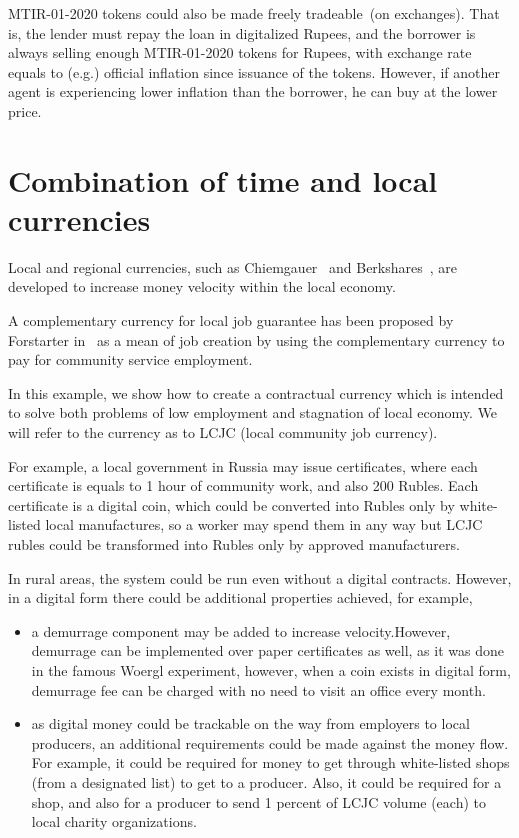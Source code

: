 \documentclass[]{llncs}   %
\begin{document}
 MTIR-01-2020 tokens could also be made freely tradeable~(on exchanges). That is, the lender must repay the loan in
 digitalized Rupees, and the borrower is always selling enough MTIR-01-2020 tokens for Rupees, with exchange rate equals
 to (e.g.) official inflation since issuance of the tokens. However, if another agent is experiencing lower inflation
 than the borrower, he can buy at the lower price.

\section{Combination of time and local currencies}
\label{sec-combination}

Local and regional currencies, such as Chiemgauer~\cite{thiel2011complementary} and Berkshares~\cite{swann1995local}, are developed to increase money velocity within the local economy.

A complementary currency for local job guarantee has been proposed by Forstarter in~\cite{forstater2018complementary} as a mean
of job creation by using the complementary currency to pay for community service employment.

In this example, we show how to create a contractual currency which is intended to solve both problems of low
employment and stagnation of local economy. We will refer to the currency as to LCJC (local community job currency).

For example, a local government in Russia may issue certificates, where each certificate is equals to 1 hour of community work, and also 200 Rubles. Each certificate is a digital coin, which could be converted into Rubles only by white-listed local manufactures, so a worker may spend them in any way but LCJC rubles could be transformed into Rubles only by approved manufacturers.

In rural areas, the system could be run even without a digital contracts. However, in a digital form there could be
additional properties achieved, for example,
    \begin{itemize}
        \item{} a demurrage component may be added to increase velocity.However, demurrage can be implemented over paper 
        certificates as well, as it was done in the famous Woergl experiment, however, when a coin exists in digital form,
         demurrage fee can be charged with no need to visit an office every month.
        \item{} as digital money could be trackable on the way from employers to local producers, an additional
        requirements could be made against the money flow. For example, it could be required for money to get through
        white-listed shops (from a designated list) to get to a producer. Also, it could be required for a shop, and also for a
        producer to send 1 percent of LCJC volume (each) to local charity organizations.
    \end{itemize}
\end{document}
